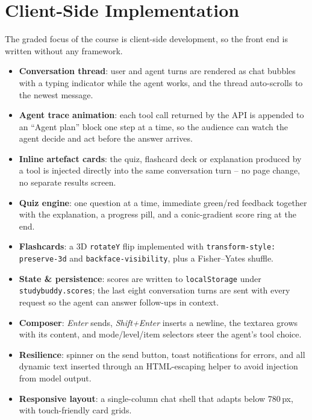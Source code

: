 \documentclass[11pt,a4paper]{article}
\begin{document}
\section{Client-Side Implementation}

The graded focus of the course is client-side development, so the front end is written without
any framework.

\begin{itemize}[leftmargin=*]
  \item \textbf{Conversation thread}: user and agent turns are rendered as chat bubbles with a
        typing indicator while the agent works, and the thread auto-scrolls to the newest message.
  \item \textbf{Agent trace animation}: each tool call returned by the API is appended to an
        ``Agent plan'' block one step at a time, so the audience can watch the agent decide and act
        before the answer arrives.
  \item \textbf{Inline artefact cards}: the quiz, flashcard deck or explanation produced by a tool
        is injected directly into the same conversation turn -- no page change, no separate results
        screen.
  \item \textbf{Quiz engine}: one question at a time, immediate green/red feedback together with
        the explanation, a progress pill, and a conic-gradient score ring at the end.
  \item \textbf{Flashcards}: a 3D \texttt{rotateY} flip implemented with
        \texttt{transform-style: preserve-3d} and \texttt{backface-visibility}, plus a Fisher--Yates
        shuffle.
  \item \textbf{State \& persistence}: scores are written to \texttt{localStorage} under
        \texttt{studybuddy.scores}; the last eight conversation turns are sent with every request
        so the agent can answer follow-ups in context.
  \item \textbf{Composer}: \emph{Enter} sends, \emph{Shift+Enter} inserts a newline, the textarea
        grows with its content, and mode/level/item selectors steer the agent's tool choice.
  \item \textbf{Resilience}: spinner on the send button, toast notifications for errors, and all
        dynamic text inserted through an HTML-escaping helper to avoid injection from model output.
  \item \textbf{Responsive layout}: a single-column chat shell that adapts below 780\,px, with
        touch-friendly card grids.
\end{itemize}
\end{document}
